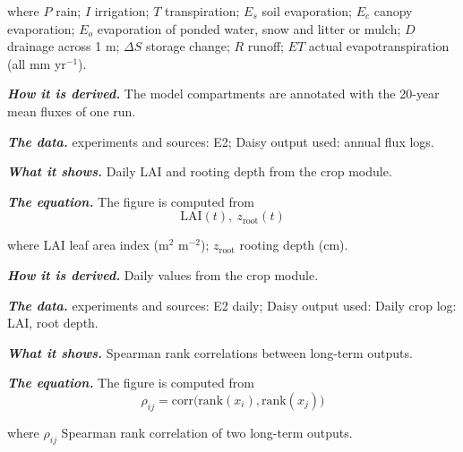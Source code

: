 \par\noindent where $P$ rain; $I$ irrigation; $T$ transpiration; $E_s$ soil evaporation; $E_c$ canopy evaporation; $E_o$ evaporation of ponded water, snow and litter or mulch; $D$ drainage across 1 m; $\Delta S$ storage change; $R$ runoff; $ET$ actual evapotranspiration (all mm yr$^{-1}$).
\par\noindent\textbf{\color{khmag}\emph{How it is derived.}} The model compartments are annotated with the 20-year mean fluxes of one run.
\par\noindent\textbf{\color{khmag}\emph{The data.}} experiments and sources: E2; Daisy output used: annual flux logs.
\par\vspace{6pt}\noindent{}\par\nobreak
{}\label{fig:a21_7}
\par\noindent\textbf{\color{khmag}\emph{What it shows.}} Daily LAI and rooting depth from the crop module.
\par\noindent\textbf{\color{khmag}\emph{The equation.}} The figure is computed from
\begin{equation}\boxed{\mathrm{LAI}(t),\ z_{\mathrm{root}}(t)}\end{equation}
\par\noindent where LAI leaf area index (m$^2$ m$^{-2}$); $z_{\mathrm{root}}$ rooting depth (cm).
\par\noindent\textbf{\color{khmag}\emph{How it is derived.}} Daily values from the crop module.
\par\noindent\textbf{\color{khmag}\emph{The data.}} experiments and sources: E2 daily; Daisy output used: Daily crop log: LAI, root depth.
\par\vspace{6pt}\noindent{}\par\nobreak
{}\label{fig:a21_8}
\par\noindent\textbf{\color{khmag}\emph{What it shows.}} Spearman rank correlations between long-term outputs.
\par\noindent\textbf{\color{khmag}\emph{The equation.}} The figure is computed from
\begin{equation}\boxed{\rho_{ij}=\mathrm{corr}\bigl(\mathrm{rank}(x_i),\mathrm{rank}(x_j)\bigr)}\end{equation}
\par\noindent where $\rho_{ij}$ Spearman rank correlation of two long-term outputs.

